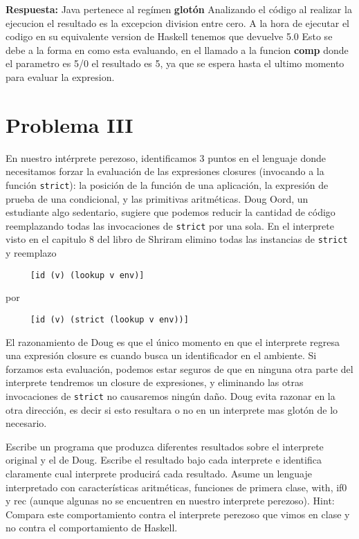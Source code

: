 \documentclass{article}
\begin{document}
\textbf{Respuesta: }
Java pertenece al regímen \textbf{glotón} Analizando el código al realizar la ejecucion el resultado es la excepcion division entre cero.
A la hora de ejecutar el codigo en su equivalente version de Haskell tenemos que devuelve 5.0
Esto se debe a la forma en como esta evaluando, en el llamado a la funcion \textbf{comp} donde el parametro es 5/0 el resultado es 5, ya que se espera hasta el ultimo momento
para evaluar la expresion.


\section*{Problema III}
En nuestro intérprete perezoso, identificamos 3 puntos en el lenguaje donde
necesitamos forzar la evaluación de las expresiones closures (invocando a la
función \texttt{strict}): la posición de la función de una aplicación,
la expresión de prueba de una condicional, y las primitivas aritméticas.
Doug Oord, un estudiante algo sedentario, sugiere que podemos reducir
la cantidad de código reemplazando todas las invocaciones de \texttt{strict}
por una sola. En el interprete visto en el capitulo 8 del libro de Shriram
elimino todas las instancias de \texttt{strict} y reemplazo
\begin{verbatim}
     [id (v) (lookup v env)]
\end{verbatim}

por

\begin{verbatim}
     [id (v) (strict (lookup v env))]
\end{verbatim}

El razonamiento de Doug es que el único momento en que el interprete regresa una
expresión closure es cuando busca un identificador en el ambiente. Si forzamos
esta evaluación, podemos estar seguros de que en ninguna otra parte del interprete
tendremos un closure de expresiones, y eliminando las otras invocaciones de
\texttt{strict} no causaremos ningún daño. Doug evita razonar en la otra dirección,
es decir si esto resultara o no en un interprete mas glotón de lo necesario.

Escribe un programa que produzca diferentes resultados sobre el interprete original
y el de Doug. Escribe el resultado bajo cada interprete e identifica claramente
cual interprete producirá cada resultado. Asume un lenguaje interpretado
con características aritméticas, funciones de primera clase, with, if0 y rec
(aunque algunas no se encuentren en nuestro interprete perezoso). Hint: Compara
este comportamiento contra el interprete perezoso que vimos en clase y no contra
el comportamiento de Haskell.
\end{document}
